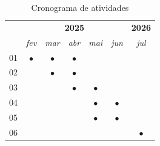 \begin{table}[htb]
  \renewcommand{\arraystretch}{1.1}
  \caption{Cronograma de atividades}
  \label{tab:cronograma}
  \centering
  \begin{tabular}{ccccccc}
    \hline
    & \multicolumn{5}{c}{\textbf{2025}} & \multicolumn{1}{c}{\textbf{2026}} \\
    & \textit{fev} & \textit{mar} & \textit{abr} & \textit{mai} & \textit{jun} & \textit{jul} \\
    \hline
    01 & $\bullet$ & $\bullet$ & $\bullet$ &            &            &            \\ \hline
    02 &            & $\bullet$ & $\bullet$ &            &            &            \\ \hline
    03 &            &            & $\bullet$ & $\bullet$ &            &            \\ \hline
    04 &            &            &            & $\bullet$ & $\bullet$ &            \\ \hline
    05 &            &            &            & $\bullet$ & $\bullet$ &            \\ \hline
    06 &            &            &            &            &            & $\bullet$ \\
    \hline
  \end{tabular}
\end{table}
